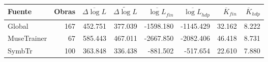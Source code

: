 \begin{tabular}{lrrrrrrr}
\hline
Fuente & Obras & $\overline{\Delta \log L}$ & $\widetilde{\Delta \log L}$ & $\overline{\log L}_{fin}$ & $\overline{\log L}_{hdp}$ & $\overline{K}_{fin}$ & $\overline{K}_{hdp}$ \\
\hline
Global & 167 & 452.751 & 377.039 & -1598.180 & -1145.429 & 32.162 & 8.222 \\
MuseTrainer & 67 & 585.443 & 467.011 & -2667.850 & -2082.406 & 46.418 & 8.731 \\
SymbTr & 100 & 363.848 & 336.438 & -881.502 & -517.654 & 22.610 & 7.880 \\
\hline
\end{tabular}
